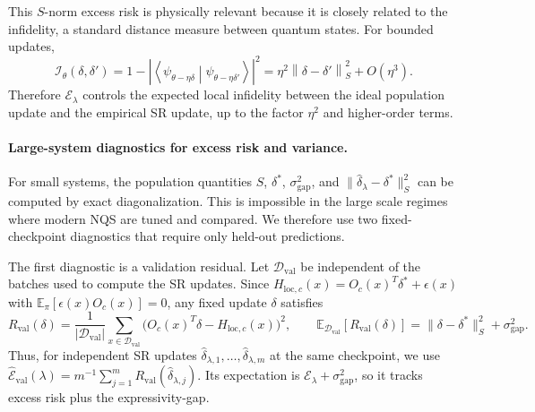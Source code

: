 \documentclass{article}
\newcommand{\Expect}{\mathbb{E}}
\newcommand{\Snorm}[1]{\left\| #1 \right\|_S^2}
\begin{document}
This \(S\)-norm excess risk is physically relevant because it is closely related to the infidelity, a standard distance measure between quantum states. For bounded updates,
\begin{equation}\label{eq:fs_local_metric}
    \mathcal I_\theta(\delta,\delta')
    =
    1-
    \left|
    \left\langle
        \psi_{\theta-\eta\delta}
        \middle|
        \psi_{\theta-\eta\delta'}
    \right\rangle
    \right|^2
    =
    \eta^2\Snorm{\delta-\delta'}
    +
    O(\eta^3).
\end{equation}
Therefore \(\mathcal E_\lambda\) controls the expected local infidelity between
the ideal population update and the empirical SR update, up to the factor
\(\eta^2\) and higher-order terms.

\paragraph{Large-system diagnostics for excess risk and variance.}
For small systems, the population quantities \(S\), \(\delta^*\),
\(\sigma_{\mathrm{gap}}^2\), and
\(\|\hat\delta_\lambda-\delta^*\|_S^2\) can be computed by exact diagonalization.
This is impossible in the large scale regimes where modern NQS are tuned
and compared. We therefore use two fixed-checkpoint diagnostics that require
only held-out predictions.

The first diagnostic is a validation residual. Let
\(\mathcal D_{\mathrm{val}}\) be independent of the batches used to compute the
SR updates. Since
\(H_{\mathrm{loc},c}(x)=O_c(x)^T\delta^*+\epsilon(x)\) with
\(\Expect_\pi[\epsilon(x)O_c(x)]=0\), any fixed update \(\delta\) satisfies
\begin{equation}\label{eq:rval_decomp}
    R_{\mathrm{val}}(\delta)
    =
    \frac1{|\mathcal D_{\mathrm{val}}|}
    \sum_{x\in\mathcal D_{\mathrm{val}}}
    \bigl(O_c(x)^T\delta-H_{\mathrm{loc},c}(x)\bigr)^2,
    \qquad
    \Expect_{\mathcal D_{\mathrm{val}}}
    \left[R_{\mathrm{val}}(\delta)\right]
    =
    \|\delta-\delta^*\|_S^2+\sigma_{\mathrm{gap}}^2 .
\end{equation}
Thus, for independent SR updates
\(\hat\delta_{\lambda,1},\dots,\hat\delta_{\lambda,m}\) at the same checkpoint,
we use
\(\widehat{\mathcal E}_{\mathrm{val}}(\lambda)
=m^{-1}\sum_{j=1}^m R_{\mathrm{val}}(\hat\delta_{\lambda,j})\). Its expectation
is \(\mathcal E_\lambda+\sigma_{\mathrm{gap}}^2\), so it tracks excess risk plus the expressivity-gap.
\end{document}
